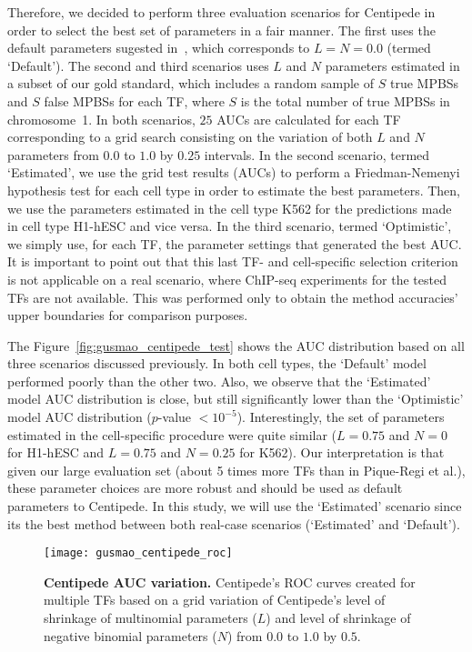 Therefore, we decided to perform three evaluation scenarios for Centipede in order to select the best set of parameters in a fair manner. The first uses the default parameters sugested in~\cite{pique2011}, which corresponds to $L = N = 0.0$ (termed `Default'). The second and third scenarios uses $L$ and $N$ parameters estimated in a subset of our gold standard, which includes a random sample of $S$ true MPBSs and $S$ false MPBSs for each TF, where $S$ is the total number of true MPBSs in chromosome~1. In both scenarios, $25$ AUCs are calculated for each TF corresponding to a grid search consisting on the variation of both $L$ and $N$ parameters from $ 0.0 $ to $ 1.0 $ by $ 0.25 $ intervals. In the second scenario, termed `Estimated', we use the grid test results (AUCs) to perform a Friedman-Nemenyi hypothesis test for each cell type in order to estimate the best parameters. Then, we use the parameters estimated in the cell type K562 for the predictions made in cell type H1-hESC and vice versa. In the third scenario, termed `Optimistic', we simply use, for each TF, the parameter settings that generated the best AUC. It is important to point out that this last TF- and cell-specific selection criterion is not applicable on a real scenario, where ChIP-seq experiments for the tested TFs are not available. This was performed only to obtain the method accuracies' upper boundaries for comparison purposes.

The Figure~\ref{fig:gusmao_centipede_test} shows the AUC distribution based on all three scenarios discussed previously. In both cell types, the `Default' model performed poorly than the other two. Also, we observe that the `Estimated' model AUC distribution is close, but still significantly lower than the `Optimistic' model AUC distribution ($p$-value $< 10^{-5}$). Interestingly, the set of parameters estimated in the cell-specific procedure were quite similar ($L=0.75$ and $N=0$ for H1-hESC and $L=0.75$ and $N=0.25$ for K562). Our interpretation is that given our large evaluation set (about 5 times more TFs than in Pique-Regi et al.\cite{pique2011}), these parameter choices are more robust and should be used as default parameters to Centipede. In this study, we will use the `Estimated' scenario since its the best method between both real-case scenarios (`Estimated' and `Default').

\begin{figure}[h!]
\centering
\texttt{[image: gusmao\_centipede\_roc]}
\caption[Centipede AUC variation]{\textbf{Centipede AUC variation.} Centipede's ROC curves created for multiple TFs based on a grid variation of Centipede's level of shrinkage of multinomial parameters ($L$) and level of shrinkage of negative binomial parameters ($N$) from $ 0.0 $ to $ 1.0 $ by $ 0.5 $.}
\label{fig:gusmao_centipede_roc}
\end{figure}

